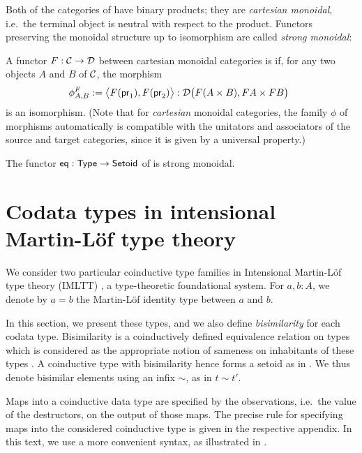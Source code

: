 \documentclass[envcountsame]{llncs}
\begin{document}
Both of the categories of  have binary products; they are \emph{cartesian monoidal}, i.e.\ the terminal 
object is neutral with respect to the product. Functors preserving the monoidal structure up to isomorphism
are called \emph{strong monoidal}:

\begin{definition}\label{def:monoidal_functor}
 A functor $F:{\mathcal{C}}\to\mathcal{D}$ between cartesian monoidal categories is  if, for any two objects $A$ and $B$ of ${\mathcal{C}}$,
  the morphism
 \[ \phi^F_{A,B} := \bigl\langle F(\mathsf{pr}_1), F(\mathsf{pr}_2) \bigr\rangle : \mathcal{D}\bigl(F(A\times B), FA\times FB\bigr)\enspace  \] 
 is an isomorphism.
 (Note that for \emph{cartesian} monoidal categories, the family $\phi$ of morphisms automatically 
  is compatible with the unitators and associators of the source and target categories, 
  since it is given by a universal property.)
\end{definition}

\begin{example}
  The functor $\mathsf{eq}: \mathsf{Type} \to \mathsf{Setoid}$ of  is strong monoidal.
\end{example}


\section{Codata types in intensional Martin-L\"of type theory}\label{sec:tri}

We consider two particular coinductive type families in Intensional Martin-L\"of type theory (IMLTT) \parencite{martin_lof}, 
a type-theoretic foundational system.
For $a,b : A$, we denote by $a = b$ the Martin-L\"of identity type between $a$ and $b$.

In this section, we present these types, and we also define \emph{bisimilarity} for each codata type.
Bisimilarity is a coinductively defined equivalence relation on types which is considered 
as the appropriate notion of sameness on inhabitants of these types \parencite{DBLP:conf/types/Coquand93, DBLP:journals/corr/abs-cs-0603119}.
A coinductive type with bisimilarity hence forms a setoid as in .
We thus denote bisimilar elements using an infix $\sim$, as in $t \sim t'$. 

Maps into a coinductive data type are specified by the observations, i.e.\ the value of the destructors, on the output of those maps.  
The precise rule for specifying maps into the considered coinductive type is given in the respective appendix.
In this text, we use a more convenient syntax, as illustrated in .
\end{document}

